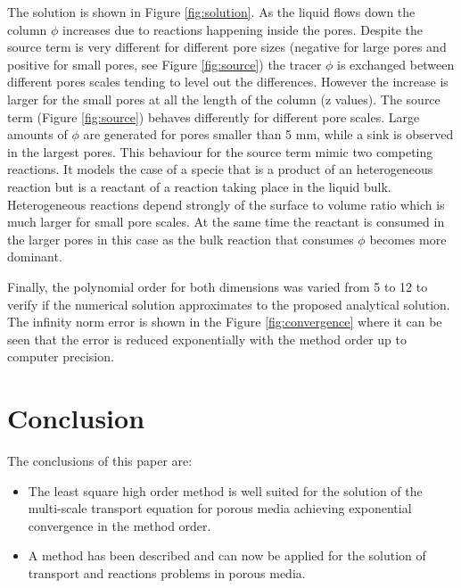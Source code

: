 \documentclass{CFD2011}
\newcommand{\TODO}[1]{\textcolor{blue}{TODO: #1} \\}
\begin{document}
The solution is shown in Figure \ref{fig:solution}. As the liquid flows down the column $\phi$ increases due to reactions happening inside the pores. Despite the source term is very different for different pore sizes (negative for large pores and positive for small pores, see Figure \ref{fig:source}) the tracer $\phi$ is exchanged between different pores scales tending to level out the differences. However the increase is larger for the small pores at all the length of the column (z values). The source term (Figure \ref{fig:source}) behaves differently for different pore scales. Large amounts of $\phi$ are generated for pores smaller than 5 mm, while a sink is observed in the largest pores. This behaviour for the source term mimic two competing reactions. It models the case of a specie that is a product of an heterogeneous reaction but is a reactant of a reaction taking place in the liquid bulk. Heterogeneous reactions depend strongly of the surface to volume ratio which is much larger for small pore scales. At the same time the reactant is consumed in the larger pores in this case as the bulk reaction that consumes $\phi$ becomes more dominant.




Finally, the polynomial order for both dimensions was varied from 5 to 12 to verify if the numerical solution approximates to the proposed analytical solution. The infinity norm error is shown in the Figure \ref{fig:convergence} where it can be seen that the error is reduced exponentially with the method order up to computer precision.



\section{Conclusion}

The conclusions of this paper are:

\begin{itemize}
\item The least square high order method is well suited for the solution of the multi-scale transport equation for porous media achieving exponential convergence in the method order.
\item A method has been described and can now be applied for the solution of transport and reactions problems in porous media.
\end{itemize}
\end{document}
